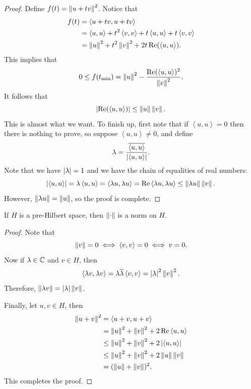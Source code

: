 \documentclass[a4paper]{article}
\renewcommand{\braket}[2]{\left\langle #1, #1 \right\rangle}
\begin{document}
\begin{proof}
Define $f(t) = \left\lVert u + tv\right\rVert^2$. Notice that 
\[
\begin{aligned}
  f(t) 
  &= \braket{u + tv}{u + tv}  \\
  &= \braket{u}{u} 
  + t^2 \braket{v}{v} + t \braket{u}{v} + t \braket{v}{u} \\
  &= \norm{u}^2 + t^2 \norm{v}^2 + 2t \Re(\braket{u}{v}).
\end{aligned}
\]  
This implies that 
\[
0 \leq f(t_{\text{min}}) = \norm{u}^2 - 
\frac{\Re(\braket{u}{v})^2}{\norm{v}^2}.
\]
It follows that 
\[
\abs{\Re( \braket{u}{v} )} \leq \norm{u} \norm{v}.
\]
This is almost what we want. 
To finish up, first note that if 
$\braket{u}{v} = 0$ then there is nothing to prove,
so suppose $\braket{u}{v} \neq 0$,
and define 
\[
\lambda = \frac{\bar{\braket{u}{v}}}{\abs{\braket{u}{v}}}.
\]
Note that we have $\left\lvert \lambda\right\rvert = 1$ and we have 
the chain of equalities of real numbers:
\[
\abs{\braket{u}{v}} = \lambda \braket{u}{v} 
= \braket{\lambda u}{v} = \Re \braket{\lambda u}{v} 
\leq \norm{\lambda u} \norm{v}.
\]
However, $\left\lVert \lambda u\right\rVert = \left\lVert u\right\rVert$, so the proof is 
complete.

\end{proof}

\begin{thm}
If $H$ is a pre-Hilbert space, then $\left\lVert \cdot\right\rVert$ 
is a norm on $H$.
\end{thm}

\begin{proof}
  Note that 
  \[
  \norm{v} = 0 \iff \braket{v}{v} = 0 \iff v = 0.
  \]
  Now if $\lambda \in \mathbb{C}$ and $v \in H$, then 
  \[
  \braket{\lambda v}{\lambda v} = \lambda \bar{\lambda}
  \braket{v}{v} = \abs{\lambda}^2 \norm{v}^2.
  \]
  Therefore, $\left\lVert \lambda v\right\rVert = \left\lvert \lambda\right\rvert \left\lVert v\right\rVert$. 
  
  Finally, let $u, v \in H$, then 
  \[
  \begin{aligned}
    \norm{u + v}^2 
    &= \braket{u + v}{u + v} \\
    &= \norm{u}^2 + \norm{v}^2 + 2 \Re \braket{u}{v} \\
    &\leq \norm{u}^2 + \norm{v}^2 + 2 \abs{\braket{u}{v}} \\
    &\leq \norm{u}^2 + \norm{v}^2 + 2 \norm{u} \norm{v} \\
    &= (\norm{u} + \norm{v})^2.
  \end{aligned}
  \]
  This completes the proof.
\end{proof}
\end{document}
